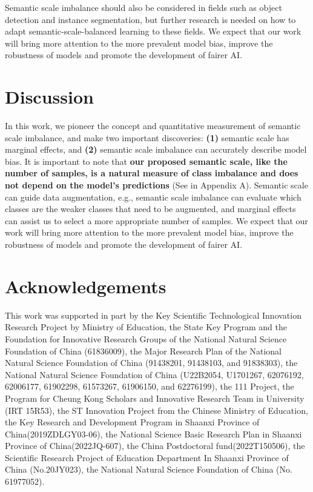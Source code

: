 \documentclass[10pt]{article} %
\begin{document}
Semantic scale imbalance should also be considered in fields such as object detection and instance segmentation, but further research is needed on how to adapt
semantic-scale-balanced learning to these ﬁelds. We expect that our work will bring more attention to the more prevalent model bias, improve the robustness of models and promote the development of fairer AI.
\fi

\section{Discussion\label{discussion}}
In this work, we pioneer the concept and quantitative measurement of semantic scale imbalance, and make two important discoveries: \textbf{(1)} semantic scale has marginal effects, and \textbf{(2)} semantic scale imbalance can accurately describe model bias. It is important to note that \textbf{our proposed semantic scale, like the number of samples, is a natural measure of class imbalance and does not depend on the model's predictions} (See  in Appendix A). Semantic scale can guide data augmentation, e.g., semantic scale imbalance can evaluate which classes are the weaker classes that need to be augmented, and marginal effects can assist us to select a more appropriate number of samples. We expect that our work will bring more attention to the more prevalent model bias, improve the robustness of models and promote the development of fairer AI.

\section{Acknowledgements\label{Acknowledgements}}
This work was supported in part by
the Key Scientific Technological Innovation Research Project by Ministry of Education,
the State Key Program and the Foundation for Innovative Research Groups of the National Natural Science Foundation of China (61836009),
the Major Research Plan of the National Natural Science Foundation of China (91438201, 91438103, and 91838303),
the National Natural Science Foundation of China (U22B2054, U1701267, 62076192, 62006177, 61902298, 61573267, 61906150, and 62276199),
the 111 Project,
the Program for Cheung Kong Scholars and Innovative Research Team in University (IRT 15R53),
the ST Innovation Project from the Chinese Ministry of Education,
the Key Research and Development Program in Shaanxi Province of China(2019ZDLGY03-06),
the National Science Basic Research Plan in Shaanxi Province of China(2022JQ-607),
the China Postdoctoral fund(2022T150506),
the Scientific Research Project of Education Department In Shaanxi Province of China (No.20JY023),
the National Natural Science Foundation of China (No. 61977052).
\end{document}
